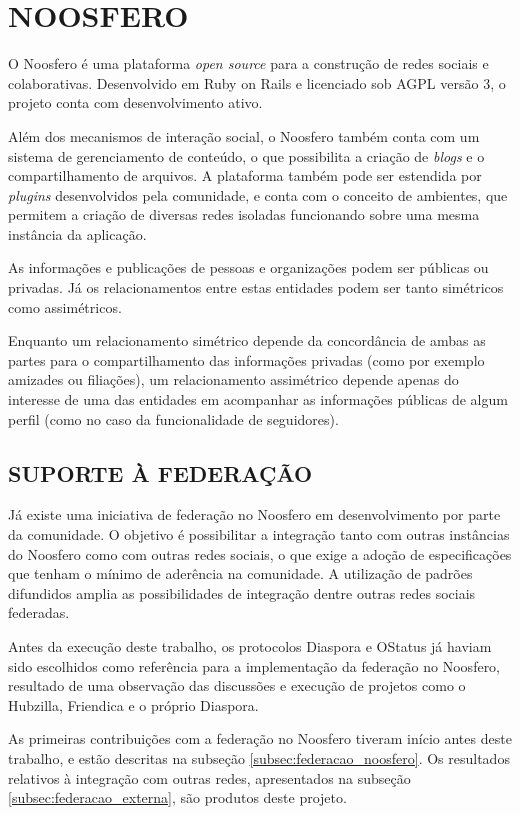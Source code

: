 \chapter{NOOSFERO}
\label{chapter:3}

O Noosfero é uma plataforma \textit{open source} para a construção de redes sociais
e colaborativas. Desenvolvido em Ruby on Rails e licenciado sob AGPL versão 3, o
projeto conta com desenvolvimento ativo.

Além dos mecanismos de interação social, o Noosfero também conta com um sistema de
gerenciamento de conteúdo, o que possibilita a criação de \textit{blogs} e o
compartilhamento de arquivos. A plataforma também pode ser estendida por
\textit{plugins} desenvolvidos pela comunidade, e conta com o conceito de ambientes,
que permitem a criação de diversas redes isoladas funcionando sobre uma mesma
instância da aplicação.

As informações e publicações de pessoas e organizações podem ser públicas ou
privadas. Já os relacionamentos entre estas entidades podem ser tanto simétricos
como assimétricos.

Enquanto um relacionamento simétrico depende da concordância de ambas as partes para
o compartilhamento das informações privadas (como por exemplo amizades ou
filiações), um relacionamento assimétrico depende apenas do interesse de uma das
entidades em acompanhar as informações públicas de algum perfil (como no caso da
funcionalidade de seguidores).



\section{SUPORTE À FEDERAÇÃO}

Já existe uma iniciativa de federação no Noosfero em desenvolvimento por parte da
comunidade. O objetivo é possibilitar a integração tanto com outras instâncias do
Noosfero como com outras redes sociais, o que exige a adoção de especificações que
tenham o mínimo de aderência na comunidade. A utilização de padrões difundidos
amplia as possibilidades de integração dentre outras redes sociais federadas.

Antes da execução deste trabalho, os protocolos Diaspora e OStatus já haviam sido
escolhidos como referência para a implementação da federação no Noosfero, resultado
de uma observação das discussões e execução de projetos como o Hubzilla, Friendica e
o próprio Diaspora.

As primeiras contribuições com a federação no Noosfero tiveram início antes deste
trabalho, e estão descritas na subseção \ref{subsec:federacao_noosfero}. Os
resultados relativos à integração com outras redes, apresentados na subseção
\ref{subsec:federacao_externa}, são produtos deste projeto.


